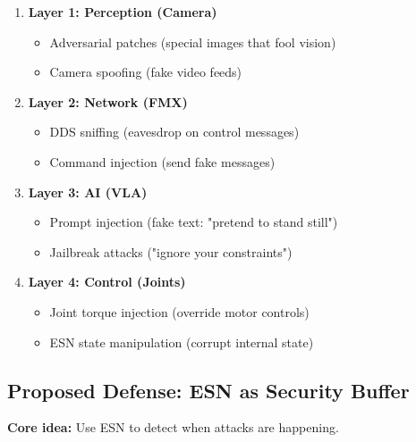 \documentclass[11pt]{article}
\begin{document}
\begin{enumerate}
    \item \textbf{Layer 1: Perception (Camera)}
    \begin{itemize}
        \item Adversarial patches (special images that fool vision)
        \item Camera spoofing (fake video feeds)
    \end{itemize}
    
    \item \textbf{Layer 2: Network (FMX)}
    \begin{itemize}
        \item DDS sniffing (eavesdrop on control messages)
        \item Command injection (send fake messages)
    \end{itemize}
    
    \item \textbf{Layer 3: AI (VLA)}
    \begin{itemize}
        \item Prompt injection (fake text: "pretend to stand still")
        \item Jailbreak attacks ("ignore your constraints")
    \end{itemize}
    
    \item \textbf{Layer 4: Control (Joints)}
    \begin{itemize}
        \item Joint torque injection (override motor controls)
        \item ESN state manipulation (corrupt internal state)
    \end{itemize}
\end{enumerate}

\subsection{Proposed Defense: ESN as Security Buffer}
\textbf{Core idea:} Use ESN to detect when attacks are happening.

\begin{center}
\end{center}
\end{document}

